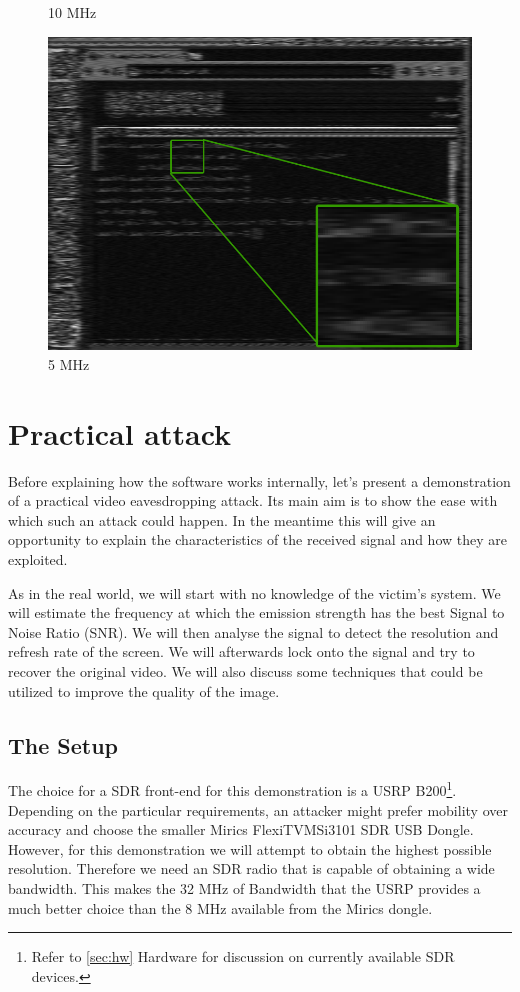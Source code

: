 \documentclass[a4paper,12pt,twoside,openright]{report}
\begin{document}
\begin{figure}[h!]
  \caption{10 MHz}
\endminipage\hfill
{}
  \centering
    \includegraphics[width=\linewidth]{sr_5MHz_at_190MHz}
  \caption{5 MHz}
\endminipage
\end{figure}


\chapter{Practical attack} 

Before explaining how the software works internally, let's present a demonstration of a practical video eavesdropping attack. Its main aim is to show the ease with which such an attack could happen. In the meantime this will give an opportunity to explain the characteristics of the received signal and how they are exploited.

As in the real world, we will start with no knowledge of the victim's system. We will estimate the frequency at which the emission strength has the best Signal to Noise Ratio (SNR). We will then analyse the signal to detect the resolution and refresh rate of the screen. We will afterwards lock onto the signal and try to recover the original video. We will also discuss some techniques that could be utilized to improve the quality of the image.

\section{The Setup}

The choice for a SDR front-end for this demonstration is a USRP B200\footnote{Refer to \ref{sec:hw} Hardware for discussion on currently available SDR devices.}. Depending on the particular requirements, an attacker might prefer mobility over accuracy and choose the smaller Mirics FlexiTV\texttrademark MSi3101 SDR USB Dongle. However, for this demonstration we will attempt to obtain the highest possible resolution. Therefore we need an SDR radio that is capable of obtaining a wide bandwidth. This makes the 32 MHz of Bandwidth that the USRP provides a much better choice than the 8 MHz available from the Mirics dongle.
\end{document}
